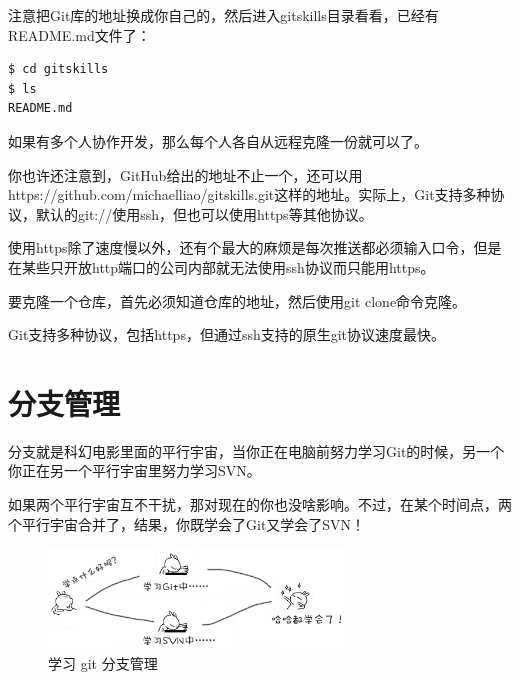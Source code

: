 注意把Git库的地址换成你自己的，然后进入gitskills目录看看，已经有README.md文件了：

\begin{verbatim}
$ cd gitskills
$ ls
README.md
\end{verbatim}

如果有多个人协作开发，那么每个人各自从远程克隆一份就可以了。

你也许还注意到，GitHub给出的地址不止一个，还可以用https://github.com/michaelliao/gitskills.git这样的地址。实际上，Git支持多种协议，默认的git://使用ssh，但也可以使用https等其他协议。

使用https除了速度慢以外，还有个最大的麻烦是每次推送都必须输入口令，但是在某些只开放http端口的公司内部就无法使用ssh协议而只能用https。

\begin{tcolorbox}

要克隆一个仓库，首先必须知道仓库的地址，然后使用git clone命令克隆。

Git支持多种协议，包括https，但通过ssh支持的原生git协议速度最快。
\end{tcolorbox}

\chapter{分支管理}

分支就是科幻电影里面的平行宇宙，当你正在电脑前努力学习Git的时候，另一个你正在另一个平行宇宙里努力学习SVN。

如果两个平行宇宙互不干扰，那对现在的你也没啥影响。不过，在某个时间点，两个平行宇宙合并了，结果，你既学会了Git又学会了SVN！

\begin{figure}[h]
  \centering
  \includegraphics[width=0.7\textwidth]{img/learn-branches.png}
  \caption{学习 git 分支管理}
  \label{fig:learn-branches}
\end{figure}

